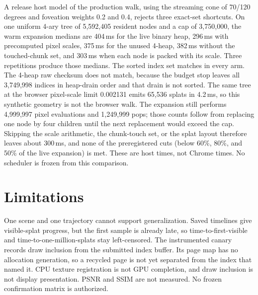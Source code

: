 \documentclass[sigconf,anonymous,review]{acmart}
\begin{document}
A release host model of the production walk, using the streaming cone of 70/120 degrees and foveation weights 0.2 and 0.4, rejects three exact-set shortcuts. On one uniform 4-ary tree of 5{,}592{,}405 resident nodes and a cap of 3{,}750{,}000, the warm expansion medians are 404\,ms for the live binary heap, 296\,ms with precomputed pixel scales, 375\,ms for the unused 4-heap, 382\,ms without the touched-chunk set, and 303\,ms when each node is packed with its scale. Three repetitions produce those medians. The sorted index set matches in every arm. The 4-heap raw checksum does not match, because the budget stop leaves all 3{,}749{,}998 indices in heap-drain order and that drain is not sorted. The same tree at the browser pixel-scale limit 0.002131 emits 65{,}536 splats in 4.2\,ms, so this synthetic geometry is not the browser walk. The expansion still performs 4{,}999{,}997 pixel evaluations and 1{,}249{,}999 pops; those counts follow from replacing one node by four children until the next replacement would exceed the cap. Skipping the scale arithmetic, the chunk-touch set, or the splat layout therefore leaves about 300\,ms, and none of the preregistered cuts (below 60\%, 80\%, and 50\% of the live expansion) is met. These are host times, not Chrome times. No scheduler is frozen from this comparison.
\section{Limitations}
One scene and one trajectory cannot support generalization. Saved timelines give visible-splat progress, but the first sample is already late, so time-to-first-visible and time-to-one-million-splats stay left-censored. The instrumented canary records draw inclusion from the submitted index buffer. Its page map has no allocation generation, so a recycled page is not yet separated from the index that named it. CPU texture registration is not GPU completion, and draw inclusion is not display presentation. PSNR and SSIM are not measured. No frozen confirmation matrix is authorized.
\end{document}
